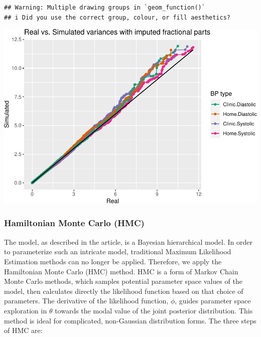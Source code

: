 \documentclass[
]{article}
\begin{document}
\begin{verbatim}
## Warning: Multiple drawing groups in `geom_function()`
## i Did you use the correct group, colour, or fill aesthetics?
\end{verbatim}

\includegraphics{Appendix_files/figure-latex/Compare variances-1.pdf}

\hypertarget{hamiltonian-monte-carlo-hmc}{%
\subsubsection{Hamiltonian Monte Carlo
(HMC)}\label{hamiltonian-monte-carlo-hmc}}

The model, as described in the article, is a Bayesian hierarchical
model. In order to parameterize such an intricate model, traditional
Maximum Likelihood Estimation methods can no longer be applied.
Therefore, we apply the Hamiltonian Monte Carlo (HMC) method. HMC is a
form of Markov Chain Monte Carlo methods, which samples potential
parameter space values of the model, then calculates directly the
likelihood function based on that choice of parameters. The derivative
of the likelihood function, \(\phi\), guides parameter space exploration
in \(\theta\) towards the modal value of the joint posterior
distribution. This method is ideal for complicated, non-Gaussian
distribution forms. The three steps of HMC are:
\end{document}
